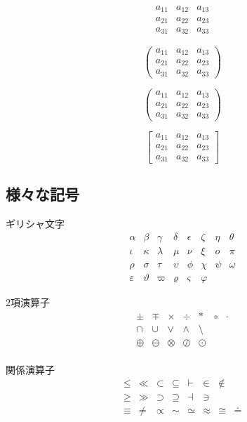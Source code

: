 \documentclass[12pt,a4j,twocolumn]{jarticle}
\begin{document}
\[
	\begin{array}{ccc}
		a_{11} & a_{12} & a_{13} \\
		a_{21} & a_{22} & a_{23} \\
		a_{31} & a_{32} & a_{33}
	\end{array}
\]

\[
	(
	\begin{array}{ccc}
		a_{11} & a_{12} & a_{13} \\
		a_{21} & a_{22} & a_{23} \\
		a_{31} & a_{32} & a_{33}
	\end{array}
	)
\]

\[
	\left(
	\begin{array}{ccc}
		a_{11} & a_{12} & a_{13} \\
		a_{21} & a_{22} & a_{23} \\
		a_{31} & a_{32} & a_{33}
	\end{array}
	\right)
\]

\[
	\left[
	\begin{array}{ccc}
		a_{11} & a_{12} & a_{13} \\
		a_{21} & a_{22} & a_{23} \\
		a_{31} & a_{32} & a_{33}
	\end{array}
	\right]
\]

\subsection{様々な記号}
ギリシャ文字
\[
\begin{array}{cccccccc}
\alpha      & \beta     & \gamma  & \delta   & \epsilon  & \zeta   & \eta & \theta  \\
\iota       & \kappa    & \lambda & \mu      & \nu       & \xi     & o    & \pi     \\
\rho        & \sigma    & \tau    & \upsilon & \phi      & \chi    & \psi & \omega  \\
\varepsilon & \vartheta & \varpi  & \varrho  & \varsigma & \varphi &      &
\end{array}
\]

2項演算子
\[
\begin{array}{ccccccc}
\pm & \mp &\times & \div & \ast & \circ & \cdot \\
\cap & \cup & \vee & \wedge & \setminus \\
\oplus & \ominus & \otimes & \oslash & \odot \\
\end{array}
\]

関係演算子
\[
\begin{array}{cccccccc}
\le & \ll & \subset & \subseteq & \vdash & \in & \notin \\
\ge & \gg & \supset & \supseteq & \dashv & \ni \\
\equiv & \neq & \propto &
\sim & \simeq & \approx & \cong & \doteq \\
\end{array}
\]
\end{document}
